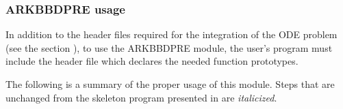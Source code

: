 \documentclass[letterpaper,10pt,english]{sphinxmanual}
\begin{document}
\subsubsection{ARKBBDPRE usage}
\label{c_interface/Preconditioners:arkbbdpre-usage}
In addition to the header files required for the integration of the
ODE problem (see the section {\hyperref[c_interface/General:cinterface-headers]{\emph{}}}), to use the
ARKBBDPRE module, the user's program must include the header file
 which declares the needed function prototypes.

The following is a summary of the proper usage of this module. Steps
that are unchanged from the skeleton program presented in
{\hyperref[c_interface/Skeleton:cinterface-skeleton]{\emph{}}} are \emph{italicized}.
\end{document}

